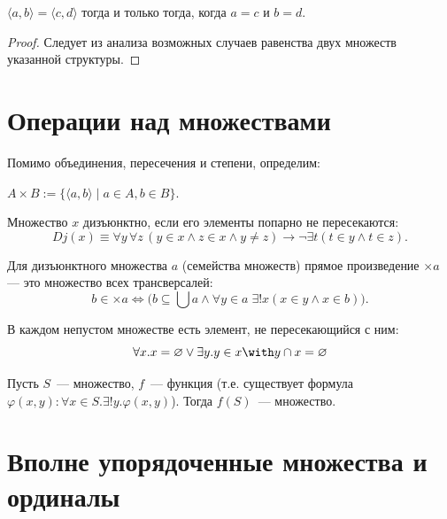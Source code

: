 \documentclass[10pt]{article}
\begin{document}
\begin{theorem}
$\langle a, b \rangle = \langle c, d \rangle$ тогда и только тогда, когда $a = c$ и $b = d$.
\end{theorem}
\begin{proof}
Следует из анализа возможных случаев равенства двух множеств указанной структуры.
\end{proof}

\section{Операции над множествами}
Помимо объединения, пересечения и степени, определим:
\begin{definition}
$A \times B := \{ \langle a, b \rangle \mid a \in A, b \in B \}$.
\end{definition}

\begin{definition}
Множество $x$ дизъюнктно, если его элементы попарно не пересекаются:
$$ Dj(x) \equiv \forall y \, \forall z \, (y \in x \land z \in x \land y \ne z) \rightarrow \neg \exists t (t \in y \land t \in z). $$
\end{definition}

\begin{definition}
Для дизъюнктного множества $a$ (семейства множеств) прямое произведение $\times a$ — это множество всех трансверсалей:
$$ b \in \times a \iff \big( b \subseteq \bigcup a \land \forall y \in a \; \exists! x (x \in y \land x \in b) \big). $$
\end{definition}

\begin{definition} В каждом непустом множестве есть элемент, не пересекающийся с ним:
$$
\forall x. x = \varnothing \vee \exists y. y \in x \with y \cap x = \varnothing
$$
    
\end{definition}

\begin{definition} Пусть $S$~--- множество, $f$~--- функция (т.е. существует формула $\varphi(x, y) : \forall x \in S. \exists !y. \varphi(x, y)$). Тогда $f(S)$~--- множество.
    
\end{definition}

\section{Вполне упорядоченные множества и ординалы}
\end{document}
